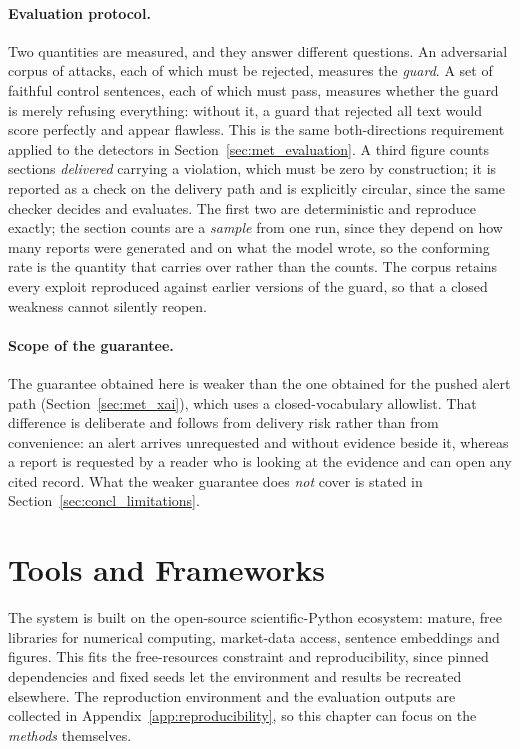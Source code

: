 \paragraph{Evaluation protocol.} Two quantities are measured, and they answer different questions.
An adversarial corpus of attacks, each of which must be rejected, measures the \emph{guard}. A set of
faithful control sentences, each of which must pass, measures whether the guard is merely refusing
everything: without it, a guard that rejected all text would score perfectly and appear flawless.
This is the same both-directions requirement applied to the detectors in
Section~\ref{sec:met_evaluation}. A third figure counts sections \emph{delivered} carrying a
violation, which must be zero by construction; it is reported as a check on the delivery path and is
explicitly circular, since the same checker decides and evaluates. The first two are deterministic
and reproduce exactly; the section counts are a \emph{sample} from one run, since they depend on how
many reports were generated and on what the model wrote, so the conforming rate is the quantity that
carries over rather than the counts. The corpus retains every exploit
reproduced against earlier versions of the guard, so that a closed weakness cannot silently reopen.

\paragraph{Scope of the guarantee.} The guarantee obtained here is weaker than the one obtained for
the pushed alert path (Section~\ref{sec:met_xai}), which uses a closed-vocabulary allowlist. That
difference is deliberate and follows from delivery risk rather than from convenience: an alert
arrives unrequested and without evidence beside it, whereas a report is requested by a reader who is
looking at the evidence and can open any cited record. What the weaker guarantee does \emph{not}
cover is stated in Section~\ref{sec:concl_limitations}.

\section{Tools and Frameworks}
\label{sec:met_tools}

The system is built on the open-source scientific-Python ecosystem: mature, free libraries for numerical
computing, market-data access, sentence embeddings and figures. This fits the free-resources constraint and
reproducibility, since pinned dependencies and fixed seeds let the environment and results be recreated
elsewhere. The reproduction environment and the evaluation outputs are collected in
Appendix~\ref{app:reproducibility}, so this chapter can focus on the \emph{methods} themselves.

